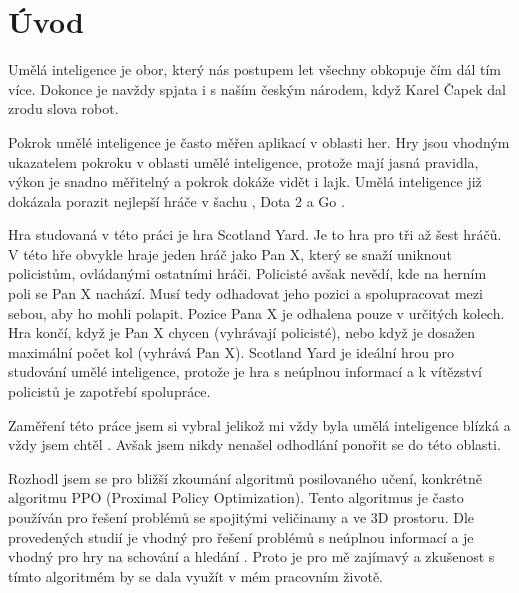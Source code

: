 
%

\chapter{Úvod}
\label{uvod}

Umělá inteligence je obor, který nás postupem let všechny obkopuje čím dál tím více.
Dokonce je navždy spjata i s naším českým národem, když Karel Čapek dal zrodu slova robot.

Pokrok umělé inteligence je často měřen aplikací v oblasti her.
Hry jsou vhodným ukazatelem pokroku v oblasti umělé inteligence, protože mají jasná pravidla, výkon je snadno měřitelný a pokrok dokáže vidět i lajk.
Umělá inteligence již dokázala porazit nejlepší hráče v šachu \cite{DeepBlue}, Dota 2 \cite{Dota2} a Go \cite{AlphaGo}.

Hra studovaná v této práci je hra Scotland Yard. Je to hra pro tři až šest hráčů.
V této hře obvykle hraje jeden hráč jako Pan X, který se snaží uniknout policistům, ovládanými ostatními hráči.
Policisté avšak nevědí, kde na herním poli se Pan X nachází. Musí tedy odhadovat jeho pozici a spolupracovat mezi sebou, aby ho mohli polapit.
Pozice Pana X je odhalena pouze v určitých kolech.
Hra končí, když je Pan X chycen (vyhrávají policisté), nebo když je dosažen maximální počet kol (vyhrává Pan X).
Scotland Yard je ideální hrou pro studování umělé inteligence, protože je hra s neúplnou informací a k vítězství policistů je zapotřebí spolupráce.

Zaměření této práce jsem si vybral jelikož mi vždy byla umělá inteligence blízká a vždy jsem chtěl .
Avšak jsem nikdy nenašel odhodlání ponořit se do této oblasti.

Rozhodl jsem se pro bližší zkoumání algoritmů posilovaného učení, konkrétně algoritmu PPO (Proximal Policy Optimization).
Tento algoritmus je často používán pro řešení problémů se spojitými veličinamy a ve 3D prostoru.
Dle provedených studií je vhodný pro řešení problémů s neúplnou informací \cite{Manille} a je vhodný pro hry na schování a hledání \cite{PPO_Hide_Seek}.
Proto je pro mě zajímavý a zkušenost s tímto algoritmém by se dala využít v mém pracovním životě.

